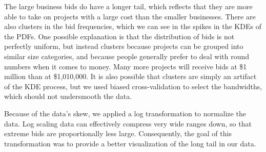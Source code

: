 The large business bids do have a longer tail, which reflects that
they are more able to take on projects with a large cost than
the smaller businesses.
There are also clusters in the bid frequencies, which we can see in
the spikes in the KDEs of the PDFs. One possible explanation is that the distribution
of bids is not perfectly uniform, but instead clusters because projects
can be grouped into similar size categories, and because people generally prefer
to deal with round numbers when it comes to money.
Many more projects will receive bids at \$1 million than at
\$1,010,000.
It is also possible that clusters are simply an artifact of the KDE process,
but we used biased cross-validation to select the bandwidths, which should
not undersmooth the data.

Because of the data's skew, we applied a log transformation to
normalize the data. Log scaling data can effectively compress
very wide ranges down, so that extreme bids are proportionally less
large. Consequently, the goal of this transformation was to
provide a better visualization of the long tail in our data.
